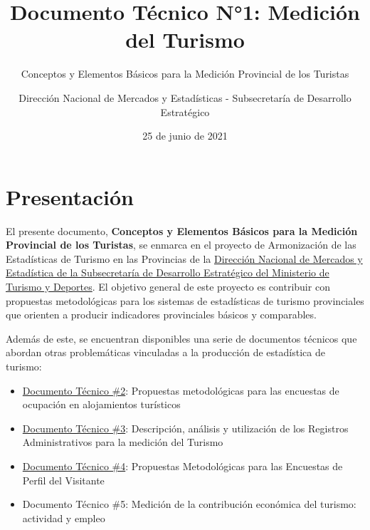 \documentclass[
  openany]{book}
\title{Documento Técnico N°1: Medición del Turismo}
\subtitle{Conceptos y Elementos Básicos para la Medición Provincial de los Turistas}
\author{Dirección Nacional de Mercados y Estadísticas - Subsecretaría de Desarrollo Estratégico}
\date{25 de junio de 2021}
\let\oldmaketitle\maketitle
\begin{document}
\maketitle


\newpage

\let\maketitle\oldmaketitle
\maketitle

{
\setcounter{tocdepth}{1}
\tableofcontents
}
\hypertarget{presentaciuxf3n}{%
\chapter*{Presentación}\label{presentaciuxf3n}}

El presente documento, \textbf{Conceptos y Elementos Básicos para la Medición Provincial de los Turistas}, se enmarca en el proyecto de Armonización de las Estadísticas de Turismo en las Provincias de la \href{http://datos.yvera.gob.ar/}{Dirección Nacional de Mercados y Estadística de la Subsecretaría de Desarrollo Estratégico del Ministerio de Turismo y Deportes}. El objetivo general de este proyecto es contribuir con propuestas metodológicas para los sistemas de estadísticas de turismo provinciales que orienten a producir indicadores provinciales básicos y comparables.

Además de este, se encuentran disponibles una serie de documentos técnicos que abordan otras problemáticas vinculadas a la producción de estadística de turismo:

\begin{itemize}
\item
  \href{https://dnme-minturdep.github.io/DT2_encuestas/}{Documento Técnico \#2}: Propuestas metodológicas para las encuestas de ocupación en alojamientos turísticos
\item
  \href{https://dnme-minturdep.github.io/DT3_registros_adminsitrativos/}{Documento Técnico \#3}: Descripción, análisis y utilización de los Registros Administrativos para la medición del Turismo
\item
  \href{https://dnme-minturdep.github.io/DT4_perfiles/}{Documento Técnico \#4}: Propuestas Metodológicas para las Encuestas de Perfil del Visitante
\item
  Documento Técnico \#5: Medición de la contribución económica del turismo: actividad y empleo
\end{itemize}
\end{document}
